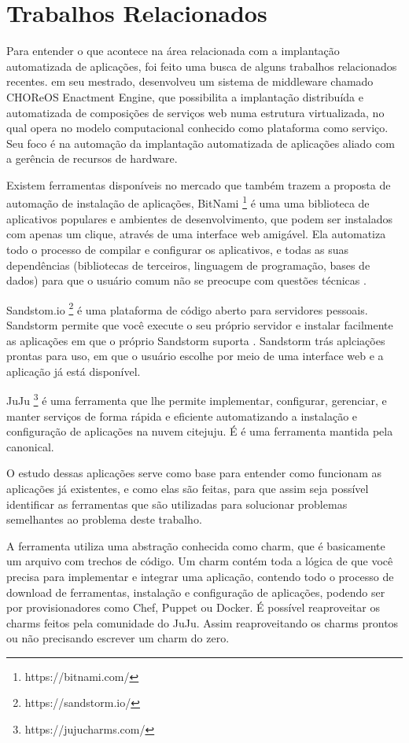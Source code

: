 \section{Trabalhos Relacionados}
\label{section:trabalhos_relacionados}

Para entender o que acontece na área relacionada com a implantação
automatizada de aplicações, foi feito uma busca de alguns trabalhos relacionados recentes.  em seu mestrado,
desenvolveu um sistema de middleware chamado CHOReOS Enactment Engine, que possibilita a implantação distribuída e automatizada de composições
de serviços web numa estrutura virtualizada, no qual opera no modelo
computacional conhecido como plataforma como serviço. Seu foco é na automação da 
implantação automatizada de aplicações aliado com a gerência de recursos de 
hardware.

Existem ferramentas disponíveis no mercado que também trazem a proposta
de automação de instalação de aplicações, BitNami \footnote{https://bitnami.com/} é uma 
uma biblioteca de aplicativos populares e ambientes de desenvolvimento, 
que podem ser instalados com apenas um clique, 
através de uma interface web amigável. Ela automatiza todo o processo de 
compilar e configurar os aplicativos, 
e todas as suas dependências (bibliotecas de terceiros, linguagem de programação, 
bases de dados) para que o usuário comum não se preocupe com questões técnicas . 

Sandstom.io \footnote{https://sandstorm.io/} é uma plataforma de código aberto para servidores
pessoais. Sandstorm permite que você execute o seu próprio servidor e instalar
facilmente as aplicações em que o próprio Sandstorm 
suporta . Sandstorm trás aplciações prontas para uso, em que o usuário escolhe por meio de uma interface web e a aplicação já está disponível.

JuJu \footnote{https://jujucharms.com/} é uma ferramenta que lhe permite 
implementar, configurar, gerenciar, 
e manter serviços de forma rápida e eficiente automatizando a instalação e 
configuração de aplicações na nuvem cite{juju}. É 
é uma ferramenta mantida pela canonical. 

O estudo dessas aplicações serve como base para entender como funcionam as aplicações
já existentes, e como elas são feitas, para que assim seja possível identificar
as ferramentas que são utilizadas para solucionar problemas semelhantes ao problema deste
trabalho. 

A ferramenta  utiliza uma abstração conhecida como charm,
que é basicamente um arquivo com trechos de código. Um charm
contém toda a lógica de que você precisa para implementar e integrar uma aplicação,
contendo todo o processo de download de ferramentas, instalação e configuração de
aplicações, podendo ser por provisionadores como Chef, Puppet ou Docker. 
É possível reaproveitar os charms feitos pela comunidade do JuJu. Assim
reaproveitando os charms prontos ou não precisando escrever um charm do zero.

